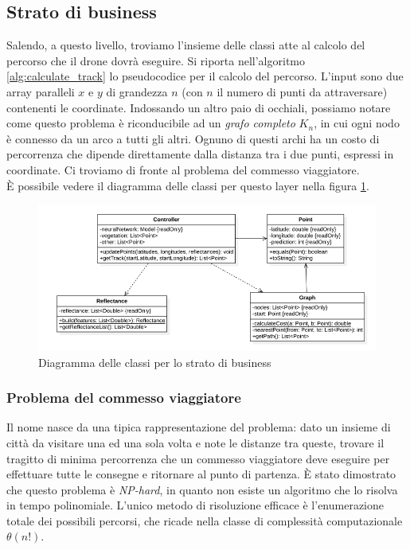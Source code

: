 \subsection{Strato di business}
Salendo, a questo livello, troviamo l'insieme delle classi atte al calcolo del percorso che il drone dovrà eseguire. Si riporta nell'algoritmo \ref{alg:calculate_track} lo pseudocodice per il calcolo del percorso. L'input sono due array paralleli $x$ e $y$ di grandezza $n$ (con $n$ il numero di punti da attraversare) contenenti le coordinate. Indossando un altro paio di occhiali, possiamo notare come questo problema è riconducibile ad un \textit{grafo completo} $K_n$, in cui ogni nodo è connesso da un arco a tutti gli altri. Ognuno di questi archi ha un costo di percorrenza che dipende direttamente dalla distanza tra i due punti, espressi in coordinate. Ci troviamo di fronte al problema del commesso viaggiatore.\\
È possibile vedere il diagramma delle classi per questo layer nella figura \ref{fig:class_diagram_business}.

\begin{figure}
    \centering
    \includegraphics[width=\textwidth]{immagini/business_classes.png}
    \caption{Diagramma delle classi per lo strato di business}
    \label{fig:class_diagram_business}
\end{figure}

\subsubsection{Problema del commesso viaggiatore}
Il nome nasce da una tipica rappresentazione del problema: dato un insieme di città da visitare una ed una sola volta e note le distanze tra queste, trovare il tragitto di minima percorrenza che un commesso viaggiatore deve eseguire per effettuare tutte le consegne e ritornare al punto di partenza. È stato dimostrato che questo problema è \textit{NP-hard}, in quanto non esiste un algoritmo che lo risolva in tempo polinomiale. L'unico metodo di risoluzione efficace è l'enumerazione totale dei possibili percorsi, che ricade nella classe di complessità computazionale $\theta(n!)$.

